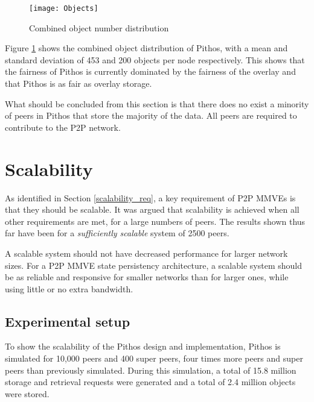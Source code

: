 \begin{figure}[htbp]
 \centering
 \texttt{[image: Objects]}
 \caption{Combined object number distribution}
 \label{fig_objects}
\end{figure}
%
Figure \ref{fig_objects} shows the combined object distribution of Pithos, with a mean and standard deviation of 453 and 200 objects per node respectively. This shows that the fairness of Pithos is currently dominated by the fairness of the overlay and that Pithos is as fair as overlay storage.

What should be concluded from this section is that there does no exist a minority of peers in Pithos that store the majority of the data. All peers are required to contribute to the P2P network.

\section{Scalability}

As identified in Section \ref{scalability_req}, a key requirement of P2P MMVEs is that they should be scalable. It was argued that scalability is achieved when all other requirements are met, for a large numbers of peers. The results shown thus far have been for a \emph{sufficiently scalable} system of 2500 peers.

A scalable system should not have decreased performance for larger network sizes. For a P2P MMVE state persistency architecture, a scalable system should be as reliable and responsive for smaller networks than for larger ones, while using little or no extra bandwidth.

\subsection{Experimental setup}

To show the scalability of the Pithos design and implementation, Pithos is simulated for 10,000 peers and 400 super peers, four times more peers and super peers than previously simulated. During this simulation, a total of 15.8 million storage and retrieval requests were generated and a total of 2.4 million objects were stored.

